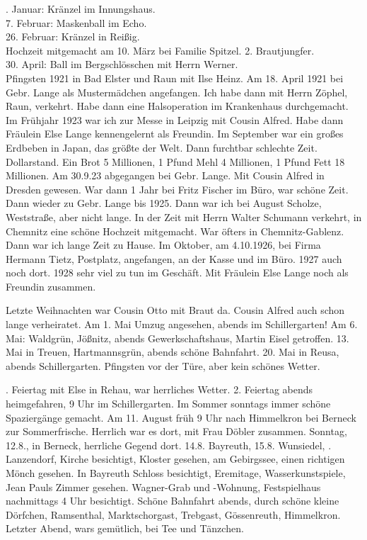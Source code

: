 \documentclass[a5paper,11pt,openany]{book}
\newcommand{\seite}[1]{\leavevmode\marginpar{\footnotesize\itshape\raggedright #1}\ignorespaces}
\newcommand{\jahr}[1]{\par\medskip\noindent{\scshape #1}\par\nopagebreak}
\begin{document}
\jahr{1921.}
\seite{4}
15. Januar: Kränzel im Innungshaus.\\
7. Februar: Maskenball im Echo.\\
26. Februar: Kränzel in Reißig.\\
Hochzeit mitgemacht am 10. März bei Familie Spitzel.
2. Brautjungfer.\\
30. April: Ball im Bergschlösschen mit Herrn Werner.\\
Pfingsten 1921 in Bad Elster und Raun mit Ilse Heinz.
Am 18. April 1921 bei Gebr. Lange als Mustermädchen angefangen.
Ich habe dann mit Herrn Zöphel, Raun, verkehrt.
Habe dann eine Halsoperation im Krankenhaus durchgemacht.
Im Frühjahr 1923
\seite{5}
war ich zur Messe in Leipzig mit Cousin Alfred.
Habe dann Fräulein Else Lange kennengelernt als Freundin.
Im September war ein großes Erdbeben in Japan, das größte der Welt.
Dann furchtbar schlechte Zeit.
Dollarstand.
Ein Brot 5 Millionen, 1 Pfund Mehl 4 Millionen, 1 Pfund Fett 18 Millionen.
Am 30.9.23 abgegangen bei Gebr. Lange.
Mit Cousin Alfred in Dresden gewesen.
War dann 1 Jahr bei Fritz Fischer im Büro, war schöne Zeit.
Dann wieder zu Gebr. Lange bis 1925.
Dann war ich bei
\seite{6}
August Scholze, Weststraße, aber nicht lange.
In der Zeit mit Herrn Walter Schumann verkehrt, in Chemnitz eine schöne Hochzeit mitgemacht.
War öfters in Chemnitz-Gablenz.
Dann war ich lange Zeit zu Hause.
Im Oktober, am 4.10.1926, bei Firma Hermann Tietz, Postplatz, angefangen, an der Kasse und im Büro.
1927 auch noch dort.
1928 sehr viel zu tun im Geschäft.
Mit Fräulein Else Lange noch als Freundin zusammen.

\jahr{1928.}
\seite{7}
Letzte Weihnachten war Cousin Otto mit Braut da.
Cousin Alfred auch schon lange verheiratet.
Am 1. Mai Umzug angesehen, abends im Schillergarten!
Am 6. Mai: Waldgrün, Jößnitz, abends Gewerkschaftshaus, Martin Eisel getroffen.
13. Mai in Treuen, Hartmannsgrün, abends schöne Bahnfahrt.
20. Mai in Reusa, abends Schillergarten.
Pfingsten vor der Türe, aber kein schönes Wetter.

\jahr{Pfingsten 1928.}
\seite{8}
1. Feiertag mit Else in Rehau, war herrliches Wetter.
2. Feiertag abends heimgefahren, 9 Uhr im Schillergarten.
Im Sommer sonntags immer schöne Spaziergänge gemacht.
Am 11. August früh 9 Uhr nach Himmelkron bei Berneck zur Sommerfrische.
Herrlich war es dort, mit Frau Döbler zusammen.
Sonntag, 12.8., in Berneck, herrliche Gegend dort.
14.8. Bayreuth, 15.8. Wunsiedel,
\seite{9}
16.8. Lanzendorf, Kirche besichtigt, Kloster gesehen, am Gebirgssee, einen richtigen Mönch gesehen.
In Bayreuth Schloss besichtigt, Eremitage, Wasserkunstspiele, Jean Pauls Zimmer gesehen.
Wagner-Grab und -Wohnung, Festspielhaus nachmittags 4 Uhr besichtigt.
Schöne Bahnfahrt abends, durch schöne kleine Dörfchen, Ramsenthal, Marktschorgast, Trebgast, Gössenreuth, Himmelkron.
Letzter Abend, wars gemütlich, bei Tee und Tänzchen.
\end{document}
